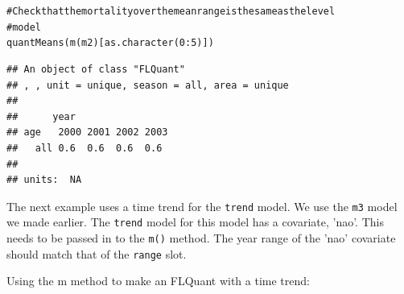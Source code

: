 \documentclass[a4paper,english,10pt]{article}\usepackage[]{graphicx}\usepackage[]{color}
\makeatletter
\newcommand{\hlnum}[1]{\textcolor[rgb]{0.2,0.2,0.2}{#1}}%
\newcommand{\hlcom}[1]{\textcolor[rgb]{0.2,0.267,0.4}{#1}}%
\newcommand{\hlopt}[1]{\textcolor[rgb]{0.2,0.2,0.2}{#1}}%
\newcommand{\hlstd}[1]{\textcolor[rgb]{0,0,0}{#1}}%
\newcommand{\hlkwd}[1]{\textcolor[rgb]{0.361,0.506,0.596}{#1}}%
\newenvironment{kframe}{%
 \def\at@end@of@kframe{}%
 \ifinner\ifhmode%
  \def\at@end@of@kframe{\end{minipage}}%
  \begin{minipage}{\columnwidth}%
 \fi\fi%
 \def\FrameCommand##1{\hskip\@totalleftmargin \hskip-\fboxsep
 \colorbox{shadecolor}{##1}\hskip-\fboxsep
     \hskip-\linewidth \hskip-\@totalleftmargin \hskip\columnwidth}%
 \MakeFramed {\advance\hsize-\width
   \@totalleftmargin\z@ \linewidth\hsize
   \@setminipage}}%
 {\par\unskip\endMakeFramed%
 \at@end@of@kframe}
\newenvironment{knitrout}{}{} %
\newcommand{\code}[1]{{\texttt{#1}}}
\makeatother
\begin{document}
\begin{knitrout}
\begin{kframe}
\begin{alltt}
\hlcom{# Check that the mortality over the mean range is the same as the level}
\hlcom{# model}
\hlkwd{quantMeans}\hlstd{(}\hlkwd{m}\hlstd{(m2)[}\hlkwd{as.character}\hlstd{(}\hlnum{0}\hlopt{:}\hlnum{5}\hlstd{)])}
\end{alltt}
\begin{verbatim}
## An object of class "FLQuant"
## , , unit = unique, season = all, area = unique
## 
##      year
## age   2000 2001 2002 2003
##   all 0.6  0.6  0.6  0.6 
## 
## units:  NA
\end{verbatim}
\end{kframe}
\end{knitrout}


The next example uses a time trend for the \code{trend} model. We use the \code{m3} model we made earlier. The \code{trend} model for this model has a covariate, 'nao'. This needs to be passed in to the \code{m()} method. The year range of the 'nao' covariate should match that of the \code{range} slot.

Using the m method to make an FLQuant with a time trend:
\end{document}
